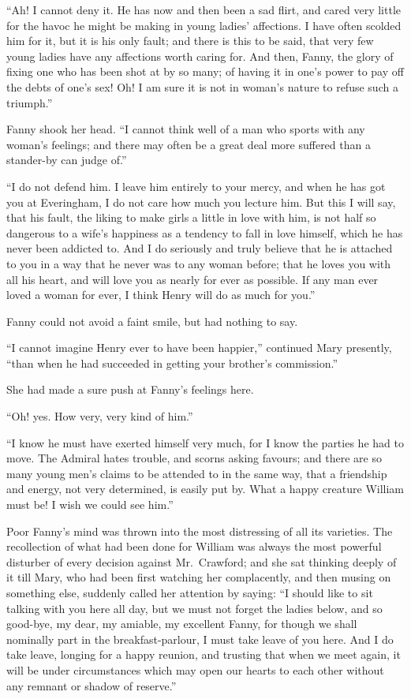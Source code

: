 ``Ah!  I cannot deny it.  He has now and then been a sad flirt,
and cared very little for the havoc he might be making in
young ladies' affections.  I have often scolded him for it,
but it is his only fault; and there is this to be said,
that very few young ladies have any affections worth
caring for.  And then, Fanny, the glory of fixing one
who has been shot at by so many; of having it in one's
power to pay off the debts of one's sex!  Oh!  I am sure
it is not in woman's nature to refuse such a triumph.''

Fanny shook her head.  ``I cannot think well of a man
who sports with any woman's feelings; and there may often
be a great deal more suffered than a stander-by can judge of.''

``I do not defend him.  I leave him entirely to your mercy,
and when he has got you at Everingham, I do not care how much
you lecture him.  But this I will say, that his fault,
the liking to make girls a little in love with him, is not
half so dangerous to a wife's happiness as a tendency to fall
in love himself, which he has never been addicted to.
And I do seriously and truly believe that he is attached
to you in a way that he never was to any woman before;
that he loves you with all his heart, and will love you
as nearly for ever as possible.  If any man ever loved
a woman for ever, I think Henry will do as much for you.''

Fanny could not avoid a faint smile, but had nothing
to say.

``I cannot imagine Henry ever to have been happier,''
continued Mary presently, ``than when he had succeeded
in getting your brother's commission.''

She had made a sure push at Fanny's feelings here.

``Oh! yes.  How very, very kind of him.''

``I know he must have exerted himself very much, for I know
the parties he had to move.  The Admiral hates trouble,
and scorns asking favours; and there are so many
young men's claims to be attended to in the same way,
that a friendship and energy, not very determined,
is easily put by.  What a happy creature William must be!
I wish we could see him.''

Poor Fanny's mind was thrown into the most distressing
of all its varieties.  The recollection of what had
been done for William was always the most powerful
disturber of every decision against Mr.\ Crawford;
and she sat thinking deeply of it till Mary, who had been
first watching her complacently, and then musing on
something else, suddenly called her attention by saying:
``I should like to sit talking with you here all day,
but we must not forget the ladies below, and so good-bye,
my dear, my amiable, my excellent Fanny, for though we
shall nominally part in the breakfast-parlour, I must
take leave of you here.  And I do take leave, longing for
a happy reunion, and trusting that when we meet again,
it will be under circumstances which may open our hearts
to each other without any remnant or shadow of reserve.''

